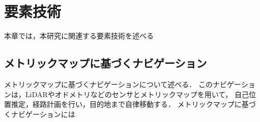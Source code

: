 \chapter{要素技術}
\label{chap:elemental}
本章では，本研究に関連する要素技術を述べる
\section{メトリックマップに基づくナビゲーション}
メトリックマップに基づくナビゲーションについて述べる．
このナビゲーションは，LiDARやオドメトリなどのセンサとメトリックマップを用いて，
自己位置推定，経路計画を行い，目的地まで自律移動する．
メトリックマップに基づくナビゲーションには